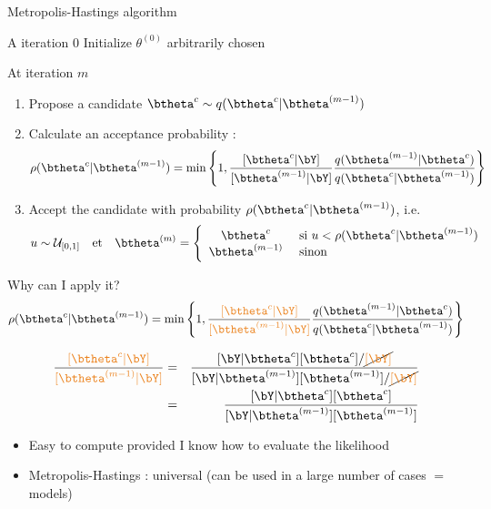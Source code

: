 \begin{frame}[allowframebreaks]{Metropolis-Hastings algorithm}
\begin{block}{A iteration $0$}
   Initialize  $\theta^{(0)}$ arbitrarily chosen  
\end{block}
     
     
 \begin{block}{At iteration  $m$}
 \begin{enumerate}
 \item Propose a candidate $\btheta^{c} \sim q(\btheta^{c} | \btheta^{(m-1)})$
 \item Calculate an acceptance probability :  
 $$ \rho(\btheta^c | \btheta^{(m-1)} )= \min\left\{1, \frac{[\btheta^{c} | \bY] }{[\btheta^{(m-1)}| \bY]} \frac{q(\btheta^{(m-1)} | \btheta^{c})}{q(\btheta^{c} | \btheta^{(m-1)})}\right\} $$
 \item  Accept the candidate with probability  $\rho(\btheta^c | \btheta^{(m-1)} )$, i.e. 
 $$u \sim \mathcal{U}_{[0,1]} \quad \mbox{et} \quad 
  \btheta^{(m)} = \left\{ \begin{array}{cl} \btheta^c & \mbox{ si } u<  \rho(\btheta^c | \btheta^{(m-1)} )\\
  \btheta^{(m-1)}  & \mbox{ sinon} 
  \end{array}
  \right.
  $$ 
\end{enumerate}
\end{block}
\end{frame}

 \begin{frame}{Why can I apply it?  }
  $$ \rho(\btheta^c | \btheta^{(m-1)} )= \min\left\{1, \frac{\vert [\btheta^{c} | \bY] }{\vert [\btheta^{(m-1)}| \bY]} \frac{q(\btheta^{(m-1)} | \btheta^{c})}{q(\btheta^{c} | \btheta^{(m-1)})}\right\} $$
  

\begin{eqnarray*}
 \frac{\vert [\btheta^{c} | \bY] }{\vert [\btheta^{(m-1)}| \bY]} &=& \frac{[\bY| \btheta^{c} ][\btheta^{c}]/\cancel{\vert [\bY]} }{[\bY| \btheta^{(m-1)} ][\btheta^{(m-1)}]/\cancel{\vert [\bY]}}\\
 &=& \frac{[\bY| \btheta^{c} ][\btheta^{c}]  }{[\bY| \btheta^{(m-1)} ][\btheta^{(m-1)}]}
 \end{eqnarray*}

 \begin{itemize}
  \item Easy to compute provided I know how to evaluate the likelihood
  \item Metropolis-Hastings :  universal (can be used in a large number of cases $=$ models)
   \end{itemize}
\vert 
\end{frame}

